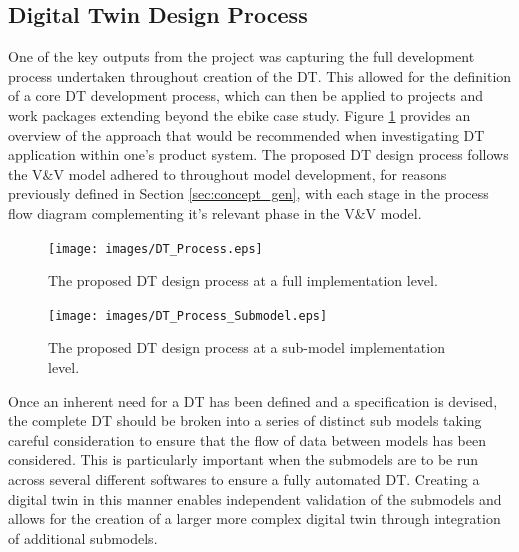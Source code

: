 \documentclass[a4paper, 10pt]{article}
\numberwithin{equation}{section}
\begin{document}
\subsection{Digital Twin Design Process}

One of the key outputs from the project was capturing the full development process undertaken throughout creation of the DT. This allowed for the definition of a core DT development process, which can then be applied to projects and work packages extending beyond the ebike case study. Figure \ref{fig:DT_tech:flowchart_top} provides an overview of the approach that would be recommended when investigating DT application within one's product system. The proposed DT design process follows the V\&V model adhered to throughout model development, for reasons previously defined in Section \ref{sec:concept_gen}, with each stage in the process flow diagram complementing it's relevant phase in the V\&V model. 

\begin{figure}[h!]
    \centering
    \texttt{[image: images/DT\_Process.eps]}
    \caption{The proposed DT design process at a full implementation level.}
    \label{fig:DT_tech:flowchart_top}
\end{figure}

\begin{figure}[h!]
    \centering
    \texttt{[image: images/DT\_Process\_Submodel.eps]}
    \caption{The proposed DT design process at a sub-model implementation level.}
    \label{fig:DT_tech:flowchart_sub}
\end{figure}

Once an inherent need for a DT has been defined and a specification is devised, the complete DT should be broken into a series of distinct sub models taking careful consideration to ensure that the flow of data between models has been considered. This is particularly important when the submodels are to be run across several different softwares to ensure a fully automated DT. Creating a digital twin in this manner enables independent validation of the submodels and allows for the creation of a larger more complex digital twin through integration of additional submodels.
\end{document}
